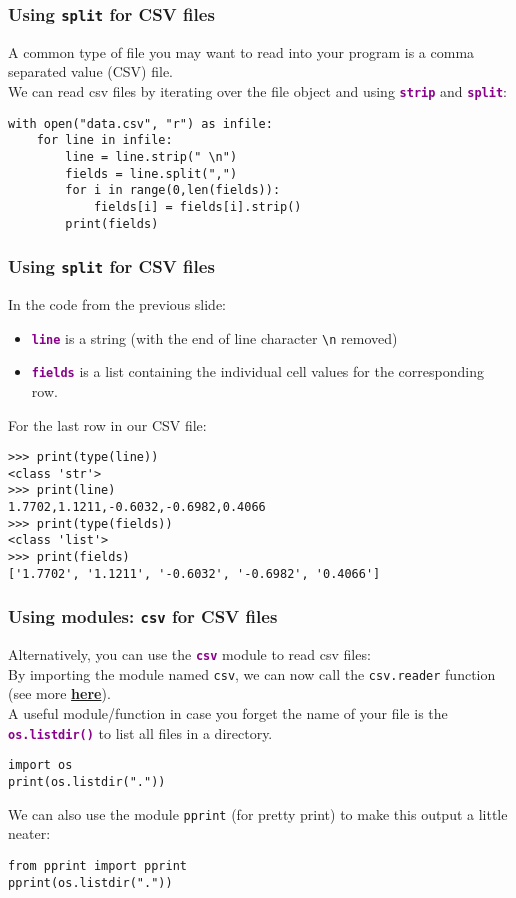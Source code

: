 \documentclass[xcolor=svgnames]{beamer}
\newcommand{\nl}{\\[1em]}
\newcommand{\command}[1]{\texttt{\textbf{\textcolor{DarkMagenta}{#1}}}}
\newcommand{\ft}[1]{\frametitle{#1}}
\begin{document}
\begin{frame}[fragile]\ft{Using {\tt split} for CSV files}
A common type of file you may want to read into your program is a comma separated value (CSV) file.\nl
We can read csv files by iterating over the file object and using \command{strip} and \command{split}:\nl
\begin{Verbatim}[xleftmargin=.5in, frame=single]
with open("data.csv", "r") as infile:
    for line in infile:
        line = line.strip(" \n")
        fields = line.split(",")
        for i in range(0,len(fields)):
            fields[i] = fields[i].strip()
        print(fields)
\end{Verbatim}
\end{frame}


\begin{frame}[fragile]\ft{Using {\tt split} for CSV files}
\vfill
In the code from the previous slide:
\begin{itemize}
\item \command{line} is a string (with the end of line character \verb|\n| removed)
\item \command{fields} is a list containing the individual cell values for the corresponding row.
\end{itemize}
\vfill
For the last row in our CSV file:
\vfill
\begin{Verbatim}[frame=single]
>>> print(type(line))
<class 'str'>
>>> print(line)
1.7702,1.1211,-0.6032,-0.6982,0.4066
>>> print(type(fields))
<class 'list'>
>>> print(fields)
['1.7702', '1.1211', '-0.6032', '-0.6982', '0.4066']
\end{Verbatim}
\vfill
\end{frame}



\begin{frame}[fragile]\ft{Using modules: {\tt csv} for CSV files}
Alternatively, you can  use the \command{csv} module to read csv files:\nl

By importing the module named {\tt csv}, we can now call the {\tt csv.reader} function (see more \href{https://docs.python.org/3/library/csv.html}{\bf here}).\nl

A useful module/function in case you forget the name of your file is the \command{os.listdir()} to list all files in a directory.  
\begin{Verbatim}[xleftmargin=.5in, frame=single]
import os
print(os.listdir("."))
\end{Verbatim}
We can also use the module {\tt pprint} (for pretty print) to make this output a little neater:
\begin{Verbatim}[xleftmargin=.5in, frame=single]
from pprint import pprint
pprint(os.listdir("."))
\end{Verbatim}
\end{frame}
\end{document}
